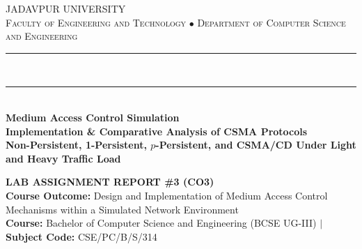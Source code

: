 \documentclass[11pt,a4paper]{article}
\begin{document}
\hypersetup{pageanchor=false}
\begin{titlepage}
\thispagestyle{empty}
\centering

\vspace*{0.2cm}
{\scshape\LARGE JADAVPUR UNIVERSITY}\\[0.2cm]
{\scshape\normalsize Faculty of Engineering and Technology $\bullet$ Department of Computer Science and Engineering}\\[0.35cm]

\rule{11cm}{1.2pt}\\[-0.2cm]
\rule{9cm}{0.6pt}\\[0.6cm]

{\color{navyblue}\LARGE\bfseries Medium Access Control Simulation}\\[0.25cm]
{\color{navyblue!85}\large\bfseries Implementation \& Comparative Analysis of CSMA Protocols}\\[0.2cm]
{\color{deepgold}\normalsize\textbf{Non-Persistent, 1-Persistent, $p$-Persistent, and CSMA/CD Under Light and Heavy Traffic Load}}\\[0.45cm]

\begin{tcolorbox}[
    colback=softblue!30,
    colframe=navyblue,
    boxrule=0.8pt,
    arc=1.5mm,
    width=0.92\textwidth,
    left=10pt, right=10pt, top=7pt, bottom=7pt,
    halign=center
]
    \textbf{\color{navyblue}\normalsize LAB ASSIGNMENT REPORT \#3 (CO3)}\\[0.15cm]
    {\small\textbf{Course Outcome:} Design and Implementation of Medium Access Control Mechanisms within a Simulated Network Environment}\\[0.1cm]
    {\footnotesize\textbf{Course:} Bachelor of Computer Science and Engineering (BCSE UG-III) $\vert$ \textbf{Subject Code:} CSE/PC/B/S/314}
\end{tcolorbox}

\vspace{0.4cm}


\end{titlepage}
\end{document}
